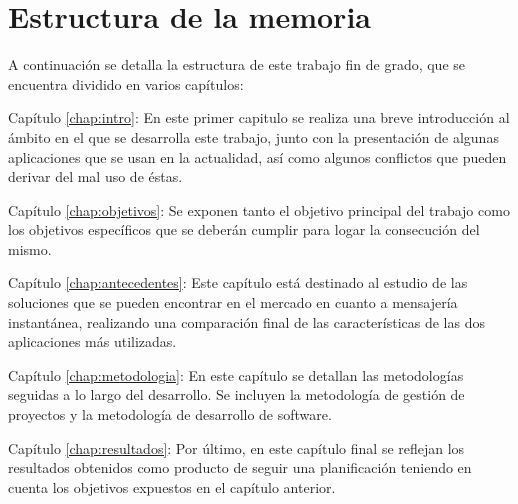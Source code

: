\section{Estructura de la memoria}
A continuación se detalla la estructura de este trabajo fin de grado, que se encuentra dividido en varios capítulos:

\begin{definitionlist}	
	\item[Capítulo \ref{chap:intro}: \nameref{chap:intro}]
	En este primer capitulo se realiza una breve introducción al ámbito en el que se desarrolla este trabajo, junto con la presentación de algunas aplicaciones que se usan en la actualidad, así como algunos conflictos que pueden derivar del mal uso de éstas.
	
	\item[Capítulo \ref{chap:objetivos}: \nameref{chap:objetivos}]
	Se exponen tanto el objetivo principal del trabajo como los objetivos específicos que se deberán cumplir para logar la consecución del mismo.
	
	\item[Capítulo \ref{chap:antecedentes}: \nameref{chap:antecedentes}]
	Este capítulo está destinado al estudio de las soluciones que se pueden encontrar en el mercado en cuanto a mensajería instantánea, realizando una comparación final de las características de las dos aplicaciones más utilizadas.
	
	\item[Capítulo \ref{chap:metodologia}: \nameref{chap:metodologia}]
	En este capítulo se detallan las metodologías seguidas a lo largo del desarrollo. Se incluyen la metodología de gestión de proyectos y la metodología de desarrollo de software.
	
	\item[Capítulo \ref{chap:resultados}: \nameref{chap:resultados}]
	Por último, en este capítulo final se reflejan los resultados obtenidos como producto de seguir una planificación teniendo en cuenta los objetivos expuestos en el capítulo anterior.
\end{definitionlist}

